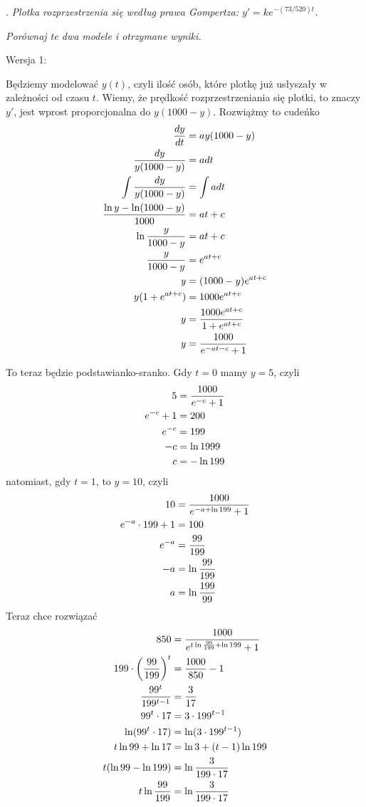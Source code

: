\documentclass{article}
\begin{document}
. \emph{Plotka rozprzestrzenia się według prawa Gompertza: $y'=ke^{-(73/520)t}$.}

\emph{Porównaj te dwa modele i otrzymane wyniki.}
\smallskip

{\color{dark-green}Wersja 1:}

Będziemy modelować $y(t)$, czyli ilość osób, które plotkę już usłyszały w zależności od czasu $t$. Wiemy, że prędkość rozprzestrzeniania się plotki, to znaczy $y'$, jest wprost proporcjonalna do $y(1000-y)$. Rozwiążmy to cudeńko
\begin{align*}
    {dy\over dt}&=ay(1000-y)\\
    {dy\over y(1000-y)}&=adt\\
    \int {dy\over y(1000-y)}&=\int adt\\
    {\ln y-\ln(1000-y)\over 1000}&=at+c\\
    \ln{y\over 1000-y}&=at+c\\
    {y\over 1000-y}&=e^{at+c}\\
    y&=(1000-y)e^{at+c}\\
    y(1+e^{at+c})&=1000e^{at+c}\\
    y&={1000e^{at+c}\over 1+e^{at+c}}\\
    y&={1000\over e^{-at-c}+1}
\end{align*}

To teraz będzie podstawianko-sranko. Gdy $t=0$ mamy $y=5$, czyli
\begin{align*}
    5&={1000\over e^{-c}+1}\\
    e^{-c}+1&=200\\
    e^{-c}&=199\\
    -c&=\ln1999\\
    c&=-\ln199
\end{align*}
natomiast, gdy $t=1$, to $y=10$, czyli
\begin{align*}
    10&={1000\over e^{-a+\ln199}+1}\\
    e^{-a}\cdot199+1&=100\\
    e^{-a}&={99\over199}\\
    -a&=\ln{99\over199}\\
    a&=\ln{199\over99}
\end{align*}
Teraz chce rozwiązać
\begin{align*}
    850&={1000\over e^{t\ln{99\over199}+\ln199}+1}\\
    199\cdot\left({99\over199}\right)^t&={1000\over 850}-1\\
    {99^t\over199^{t-1}}&={3\over17}\\
    99^t\cdot17&=3\cdot199^{t-1}\\
    \ln(99^t\cdot17)&=\ln(3\cdot199^{t-1})\\
    t\ln99+\ln17&=\ln3+(t-1)\ln199\\
    t(\ln99-\ln199)&=\ln{3\over199\cdot17}\\
    t\ln{99\over199}&=\ln{3\over199\cdot17}
\end{align*}
\smallskip
\end{document}
